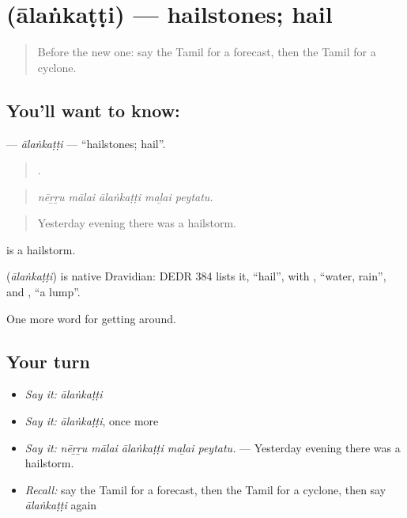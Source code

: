 \section[\texorpdfstring{\ta{ஆலங்கட்டி} (ālaṅkaṭṭi)}{ஆலங்கட்டி (ālaṅkaṭṭi)}]{ (ālaṅkaṭṭi) — hailstones; hail}

\label{lesson:TA-C429-alankatti}



\begin{quote}
Before the new one: say the Tamil for a forecast, then the Tamil for a cyclone.
\end{quote}

\subsection*{You'll want to know: }
\textbf{} — \emph{ālaṅkaṭṭi} — \textquotedblleft{}hailstones; hail\textquotedblright{}.

\begin{quote}
    .
\end{quote}

\begin{quote}
\emph{nēṟṟu mālai ālaṅkaṭṭi maḻai peytatu.}
\end{quote}

\begin{quote}
Yesterday evening there was a hailstorm.
\end{quote}

  is a hailstorm.

\begin{cousinweb}
\textbf{} (\emph{ālaṅkaṭṭi}) is native Dravidian: DEDR 384 lists it, \textquotedblleft{}hail\textquotedblright{}, with , \textquotedblleft{}water, rain\textquotedblright{}, and , \textquotedblleft{}a lump\textquotedblright{}.
\end{cousinweb}

\begin{grammarlens}[title={What you've built}]
One more word for getting around.
\end{grammarlens}

\subsection*{Your turn}
\begin{itemize}
\raggedright
  \item \emph{Say it:} \emph{ālaṅkaṭṭi}
  \item \emph{Say it:} \emph{ālaṅkaṭṭi}, once more
  \item \emph{Say it:} \emph{nēṟṟu mālai ālaṅkaṭṭi maḻai peytatu.} — Yesterday evening there was a hailstorm.
  \item \emph{Recall:} say the Tamil for a forecast, then the Tamil for a cyclone, then say \emph{ālaṅkaṭṭi} again
\end{itemize}

